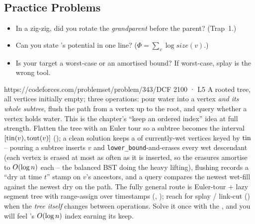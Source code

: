 \subsection{Practice Problems}

\begin{stuckbox}
\begin{itemize}[nosep, leftmargin=1.4em]
  \item In a zig-zig, did you rotate the \emph{grandparent} before the parent? (Trap~1.)
  \item Can you state 's potential in one line? ($\Phi=\sum_v \log \mathit{size}(v)$.)
  \item Is your target a worst-case or an amortised bound? If worst-case, splay is the wrong tool.
\end{itemize}
\end{stuckbox}

\begin{practiceset}
    {https://codeforces.com/problemset/problem/343/D}{CF 2100 · L5}
    {A rooted tree, all vertices initially empty; three operations: pour water into a vertex \emph{and its
    whole subtree}, flush the path from a vertex up to the root, and query whether a vertex holds water.
    This is the chapter's ``keep an ordered index'' idea at full strength. Flatten the tree with an Euler
    tour so a subtree becomes the interval $[\operatorname{tin}(v), \operatorname{tout}(v)]$ (); a clean solution keeps a
     of currently-wet vertices keyed by $\operatorname{tin}$ -- pouring a subtree inserts $v$ and
    \texttt{lower\_bound}-and-erases every wet descendant (each vertex is erased at most as often as it is
    inserted, so the erasures amortise to $O(\log n)$ each -- the balanced BST doing the heavy
    lifting), flushing records a ``dry at time $t$'' stamp on $v$'s ancestors, and a query compares the
    newest wet-fill against the newest dry on the path. The fully general route is Euler-tour $+$
    lazy segment tree with range-assign over timestamps (, ); reach for splay /
    link-cut () when the \emph{tree itself} changes between operations. Solve it once with the
    , and you will feel 's $O(\log n)$ index earning its keep.}
\end{practiceset}

